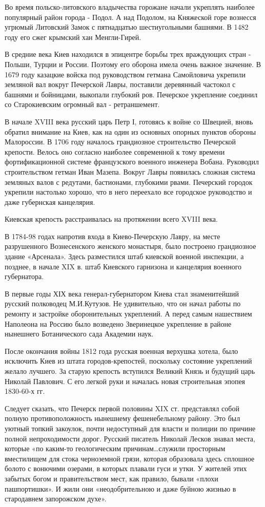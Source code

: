 Во время польско-литовского владычества горожане начали укреплять наиболее
популярный район города - Подол. А над Подолом, на Княжеской горе вознесся
угрюмый Литовский Замок с пятнадцатью шестиугольными башнями. В 1482 году его
сжег крымский хан Менгли-Гирей. 

В средние века Киев находился в эпицентре борьбы трех враждующих стран -
Польши, Турции и России. Поэтому его оборона имела очень важное значение. В
1679 году казацкие войска под руководством гетмана Самойловича укрепили
земляной вал вокруг Печерской Лавры, поставили деревянный частокол с башнями и
бойницами, выкопали глубокий ров. Печерское укрепление соединил со
Старокиевским огромный вал - ретраншемент.

В начале XVIII века русский царь Петр І, готовясь к войне со Швецией, вновь
обратил внимание на Киев, как на один из основных опорных пунктов обороны
Малороссии. В 1706 году началось грандиозное строительство Печерской крепости.
Велось оно согласно наиболее современной к тому времени фортификационной
системе французского военного инженера Вобана. Руководил строительством гетман
Иван Мазепа. Вокруг Лавры появилась сложная система земляных валов с редутами,
бастионами, глубокими рвами. Печерский городок укрепили настолько хорошо, что в
него переехало все городское руководство и даже губернская канцелярия.

Киевская крепость расстраивалась на протяжении всего XVIII века.

В 1784-98 годах напротив входа в Киево-Печерскую Лавру, на месте разрушенного
Вознесенского женского монастыря, было построено грандиозное здание «Арсенала».
Здесь разместился штаб киевской военной инспекции, а позднее, в начале XIX в.
штаб Киевского гарнизона и канцелярия военного губернатора.

В первые годы ХІХ века генерал-губернатором Киева стал знаменитейший русский
полководец М.И.Кутузов. Не удивительно, что он начал работы по ремонту и
застройке оборонительных укреплений. А перед самым нашествием Наполеона на
Россию было возведено Зверинецкое укрепление в районе нынешнего Ботанического
сада Академии наук.

После окончания войны 1812 года русская военная верхушка хотела, было исключить
Киев из штата городов-крепостей, поскольку состояние укреплений желало лучшего.
За старую крепость вступился Великий Князь и будущий царь Николай Павлович. С
его легкой руки и началась новая строительная эпопея 1830-60-х гг.

Следует сказать, что Печерск первой половины XIX ст. представлял собой полную
противоположность нынешнему фешенебельному району. Это был уютный топкий
закоулок, почти недоступный для власти и полиции по причине полной
непроходимости дорог. Русский писатель Николай Лесков знавал места, которые «по
каким-то геологическим причинам…служили просторным вместилищем для стока
черноземной грязи, которая образовала здесь сплошное болото с вонючими озерами,
в которых плавали гуси и утки. У жителей этих забытых богом и правительством
мест, как правило, бывали «плохи пашпортишки». И жили они «неодобрительною и
даже буйною жизнью в стародавнем запорожском духе».


